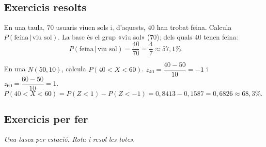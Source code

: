 \subsection{Exercicis resolts}

\begin{exresolt}
En una taula, $70$ usuaris viuen sols i, d'aquests, $40$ han trobat feina. Calcula
$P(\text{feina}\,|\,\text{viu sol})$.
\solucio
La base és el grup «viu sol» ($70$); dels quals $40$ tenen feina:
\[
P(\text{feina}\,|\,\text{viu sol})=\frac{40}{70}=\frac{4}{7}\approx 57,1\%.
\]
\end{exresolt}

\begin{exresolt}
En una $N(50,10)$, calcula $P(40<X<60)$.
\solucio
$z_{40}=\dfrac{40-50}{10}=-1$ i $z_{60}=\dfrac{60-50}{10}=1$.
\[
P(40<X<60)=P(Z<1)-P(Z<-1)=0,8413-0,1587=0,6826\approx 68,3\%.
\]
\end{exresolt}

\subsection{Exercicis per fer}

\noindent\textit{Una tasca per estació. Rota i resol-les totes.}

